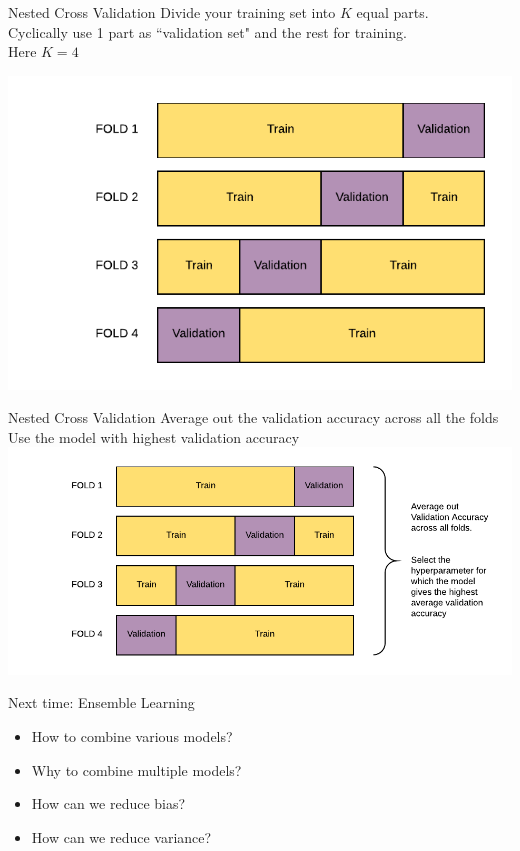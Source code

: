 \documentclass[usenames,dvipsnames]{beamer}
\begin{document}
\begin{frame}{Nested Cross Validation}
Divide your training set into $K$ equal 	parts.\\
Cyclically use 1 part as ``validation set" and the rest for training.\\
Here $K = 4$
\begin{center}
\includegraphics[scale=0.7]{../assets/cross-validation/diagrams/cross-validation.pdf}
\end{center}
\end{frame}

\begin{frame}{Nested Cross Validation}
Average out the validation accuracy across all the folds\\
Use the model with highest validation accuracy\\
\includegraphics[width = \textwidth]{../assets/cross-validation/diagrams/cross-validation-avg.pdf}
\end{frame}

\begin{frame}{Next time: Ensemble Learning}
\begin{itemize}
\item How to combine various models?
\item Why to combine multiple models?
\item How can we reduce bias?
\item How can we reduce variance?
\end{itemize}
\end{frame}
\end{document}
